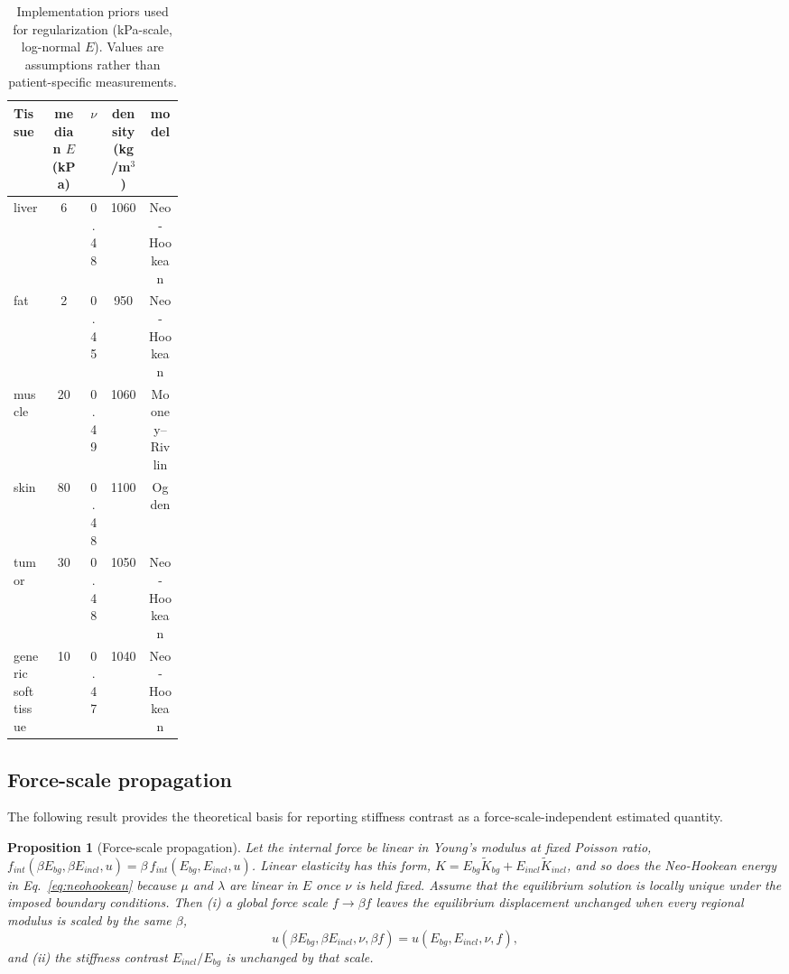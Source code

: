 \documentclass[pdflatex,lineno,referee,sn-vancouver,Numbered]{sn-jnl}
\newtheorem{proposition}{Proposition}
\begin{document}
\begin{table}[htbp]
\centering
\caption{Implementation priors used for regularization (kPa-scale,
log-normal $E$). Values are assumptions rather than patient-specific
measurements.}
\label{tab:tissue}
\footnotesize
\begin{tabular}{@{}p{0.22\linewidth}cccc@{}}
\toprule
Tissue & median $E$ (kPa) & $\nu$ & density (kg/m$^3$) & model \\
\midrule
liver & 6 & 0.48 & 1060 & Neo-Hookean \\
fat & 2 & 0.45 & 950 & Neo-Hookean \\
muscle & 20 & 0.49 & 1060 & Mooney--Rivlin \\
skin & 80 & 0.48 & 1100 & Ogden \\
tumor & 30 & 0.48 & 1050 & Neo-Hookean \\
generic soft tissue & 10 & 0.47 & 1040 & Neo-Hookean \\
\bottomrule
\end{tabular}
\end{table}

\subsection{Force-scale propagation}
\label{sec:forcescale}
The following result provides the theoretical basis for reporting
stiffness contrast as a force-scale-independent estimated quantity.

\begin{proposition}[Force-scale propagation]
\label{prop:forcescale}
Let the internal force be linear in Young's modulus at fixed Poisson ratio,
$f_{int}(\beta E_{bg}, \beta E_{incl}, u) = \beta\, f_{int}(E_{bg}, E_{incl}, u)$.
Linear elasticity has this form,
$K = E_{bg}\tilde{K}_{bg} + E_{incl}\tilde{K}_{incl}$, and so does the
Neo-Hookean energy in Eq.~\eqref{eq:neohookean} because $\mu$ and $\lambda$
are linear in $E$ once $\nu$ is held fixed. Assume that the equilibrium
solution is locally unique under the imposed boundary conditions. Then
(i) a global force scale
$f \to \beta f$ leaves the equilibrium displacement unchanged when every
regional modulus is scaled by the same $\beta$,
\begin{equation}
u(\beta E_{bg}, \beta E_{incl}, \nu, \beta f) = u(E_{bg}, E_{incl}, \nu, f),
\label{eq:scale}
\end{equation}
and (ii) the stiffness contrast $E_{incl}/E_{bg}$ is unchanged by that scale.
\end{proposition}
\end{document}
